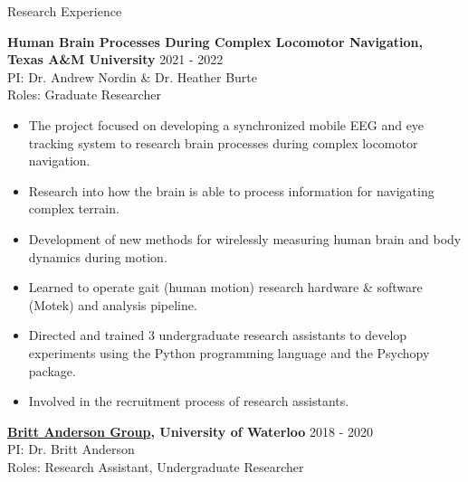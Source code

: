 \documentclass{resume} %
\begin{document}
\begin{rSection}{Research Experience}
\begin{itemize}[nosep]
    \end{itemize}
    
    {\bf {Human Brain Processes During Complex Locomotor Navigation},
        Texas A\&M University}
    \hfill {2021 - 2022}
    \\PI: Dr. Andrew Nordin \& Dr. Heather Burte
    \\Roles: Graduate Researcher
    
    \begin{itemize}[nosep]
        
        \item The project focused on developing a synchronized mobile EEG and eye tracking system to research brain processes during complex locomotor navigation.
        \item Research into how the brain is able to process information for 
        navigating complex terrain.
        \item Development of new methods for wirelessly measuring human brain and body 
        dynamics during motion.
        \item Learned to operate gait (human motion) research hardware \& software (Motek) and analysis pipeline.
        \item Directed and trained 3 undergraduate research assistants to 
        develop experiments using the Python programming language and the Psychopy package.
        \item Involved in the recruitment process of research assistants.
        
    \end{itemize}
    
    {\bf \href{https://brittlab.uwaterloo.ca/}{Britt Anderson Group}, 
        University of Waterloo}
    \hfill {2018 - 2020}
    \\PI: Dr. Britt Anderson
    \\Roles: Research Assistant, Undergraduate Researcher
    
    \begin{itemize}[nosep]
        

\end{itemize}
\end{rSection}
\end{document}
